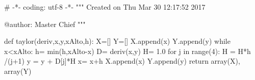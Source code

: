 # -*- coding: utf-8 -*-
"""
Created on Thu Mar 30 12:17:52 2017

@author: Master Chief
"""

def taylor(deriv,x,y,xAlto,h):
    X=[]
    Y=[]
    X.append(x)
    Y.append(y)
    while x<xAlto:
        h= min(h,xAlto-x)
        D= deriv(x,y)
        H= 1.0
        for j in range(4):
            H = H*h /(j+1)
            y = y + D[j]*H
        x= x+h
        X.append(x)
        Y.append(y)
    return array(X), array(Y)